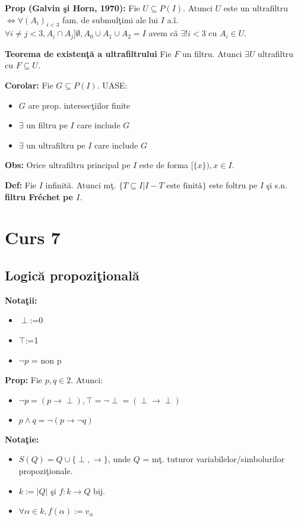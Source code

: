 \documentclass{article}
\begin{document}
\textbf{Prop (Galvin \c si Horn, 1970):} Fie $U\subseteq P(I)$. Atunci $U$ este un ultrafiltru $\iff \forall (A_i)_{i<3}$ fam. de submul\c timi ale lui $I$ a.\^ i. $\forall i\neq j<3, A_i\cap A_j]\emptyset, A_0\cup A_1\cup A_2=I$ avem c\u a $\exists ! i<3$ cu $A_i\in U$.

\textbf{Teorema de existen\c t\u a a ultrafiltrului} Fie $F$ un filtru. Atunci $\exists U$ ultrafiltru cu $F\subseteq U$.

\textbf{Corolar:} Fie $G\subseteq P(I)$. UASE:
\begin{itemize}
    \item $G$ are prop. intersec\c tiilor finite
    \item $\exists$ un filtru pe $I$ care include $G$
    \item $\exists$ un ultrafiltru pe $I$ care include $G$
\end{itemize}

\textbf{Obs:} Orice ultrafiltru principal pe $I$ este de forma $[\{x\}), x\in I$.

\textbf{Def:} Fie $I$ infinit\u a. Atunci m\c t. $\{T\subseteq I|I-T \text{ este finit\u a}\}$ este foltru pe $I$ \c si s.n. \textbf{filtru Fr\' echet pe $I$}.

\section{Curs 7}

\subsection{Logic\u a propozi\c tional\u a}

\textbf{Nota\c tii:}
\begin{itemize}
    \item \textbf{$\perp$}:=0
    \item \textbf{$\top$}:=1
    \item \textbf{$\neg p$} = non p
\end{itemize}

\textbf{Prop:} Fie $p,q\in 2$. Atunci:
\begin{itemize}
    \item $\neg p= (p\rightarrow\perp),\top=\neg \perp=(\perp \rightarrow\perp)$
    \item $p\land q=\neg(p\rightarrow\neg q)$
\end{itemize}

\textbf{Nota\c tie:} 
\begin{itemize}
    \item $S(Q)=Q\cup\{\perp,\rightarrow\}$, unde $Q$ = m\c t. tuturor variabilelor/simbolurilor propozi\c tionale.
    \item $k:=|Q|$ \c si $f:k\rightarrow Q$ bij.
    \item $\forall \alpha\in k, f(\alpha):=v_\alpha$
\end{itemize}
\end{document}

